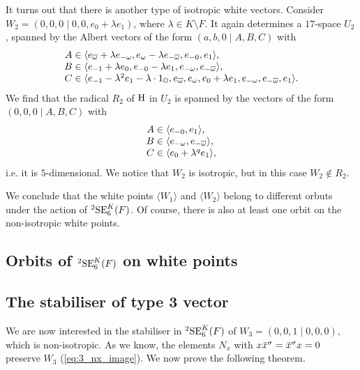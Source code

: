 It turns out that there is another type of isotropic white vectors. Consider 
$W_2 = (0,0,0 \mid 0,0,e_0 + \lambda e_1)$, where $\lambda \in K\setminus F$. It again determines a 
$17$-space $U_2$, spanned by the Albert vectors of the form $(a,b,0\mid A,B,C)$ with 
\begin{equation}
	\begin{array}{r@{\;}c@{\;}l}
		A & \in & \langle e_{\bar{\omega}}+\lambda e_{-\omega}, e_{\omega}-\lambda e_{-\bar{\omega}}
		, e_{-0}, e_1
		\rangle, \\
		B & \in & \langle e_{-1}+\lambda e_0, e_{-0} - \lambda e_1,
	e_{-\omega}, e_{-\bar{\omega}}  \rangle, \\
		C & \in & \langle e_{-1}-\lambda^2 e_1 - \lambda \cdot 1_{\O}, e_{\bar{\omega}}, e_{\omega},
	e_0 + \lambda e_1, e_{-\omega}, e_{-\bar{\omega}}, e_1 \rangle.
	\end{array}
\end{equation}
We find that the radical $R_2$ of $\mathrm{H}$ in $U_2$ is spanned by the vectors of the form 
$(0,0,0\mid A,B,C)$ with 
\begin{equation}
	\begin{array}{r@{\;}c@{\;}l}
		A & \in & \langle e_{-0}, e_1 \rangle, \\
		B & \in & \langle e_{-\omega}, e_{-\bar{\omega}} \rangle, \\
		C & \in & \langle e_0 + \lambda^q e_1 \rangle,
	\end{array}
\end{equation}
i.e. it is $5$-dimensional. We notice that $W_2$ is isotropic, but in this case $W_2 \not\in R_2$.

We conclude that the white points $\langle W_1 \rangle$ and $\langle W_2 \rangle$ belong to different
orbuts under the action of ${}^2\mathrm{SE}_6^K(F)$. Of course, there is also at least one orbit on the 
non-isotropic white points. 

\subsection{Orbits of ${}^2\mathrm{SE}_6^K(F)$ on white points}

\subsection{The stabiliser of type 3 vector}

We are now interested in the stabiliser in ${}^2\mathrm{SE}_6^K(F)$ of 
$W_3 = (0,0,1\mid 0,0,0)$, which is non-isotropic. As we know, the elements
$N_x$ with $x\ovx^{\s} = \ovx^{\s}x = 0$ preserve $W_3$ (\ref{eq:3_nx_image}).
We now prove the following theorem.

